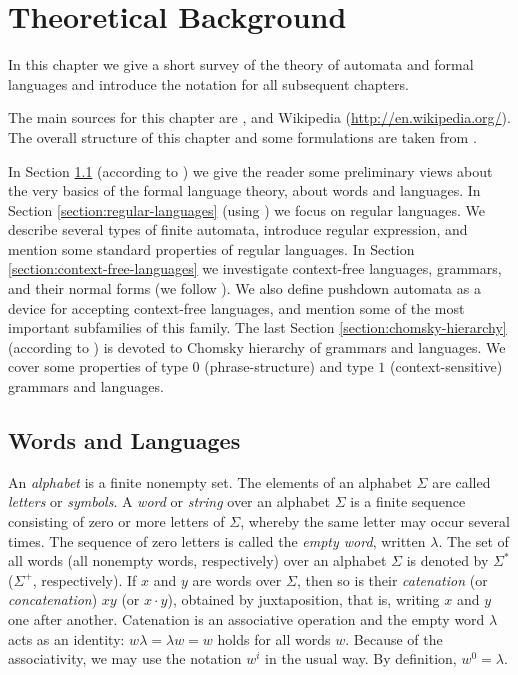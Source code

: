 \chapter{Theoretical Background}
\label{chapter:background}

In this chapter we give a short survey of the theory of automata and formal languages and introduce the notation for all subsequent chapters.

The main sources for this chapter are \citep{RozSal97I, HopcroftMotwaniUllman07}, and Wikipedia (\url{http://en.wikipedia.org/}). The overall structure of this chapter and some formulations are taken from \citep{C10Diploma}.

In Section \ref{section:words-and-languages} (according to \citep{MaSa1997formal}) we give the reader some preliminary views about the very basics of the formal language theory, about words and languages. In Section \ref{section:regular-languages} (using \citep{Sh1997regular}) we focus on regular languages. We describe several types of finite automata, introduce regular expression, and mention some standard properties of regular languages. In Section \ref{section:context-free-languages} we investigate context-free languages, grammars, and their normal forms (we follow \citep{AuBeBo1997context-free}). We also define pushdown automata as a device for accepting context-free languages, and mention some of the most important subfamilies of this family. The last Section \ref{section:chomsky-hierarchy} (according to \citep{MaSa1997aspects}) is devoted to Chomsky hierarchy of grammars and languages. We cover some properties  of type $0$ (phrase-structure) and type $1$ (context-sensitive) grammars and languages.

\section{Words and Languages}
\label{section:words-and-languages}

An \emph{alphabet} is a finite nonempty set. The elements of an alphabet $\Sigma$ are called \emph{letters} or \emph{symbols}. A \emph{word} or \emph{string} over an alphabet $\Sigma$ is a finite sequence consisting of zero or more letters of $\Sigma$, whereby the same letter may occur several times. The sequence of zero letters is called the  \emph{empty word}, written $\lambda$. The set of all words (all nonempty words, respectively) over an alphabet $\Sigma$ is denoted by $\Sigma^*$ ($\Sigma^+$, respectively). If $x$ and $y$ are words over $\Sigma$, then so is their \emph{catenation} (or \emph{concatenation}) $xy$ (or $x \cdot y$), obtained by juxtaposition, that is, writing $x$ and $y$ one after another. Catenation is an associative operation and the empty word $\lambda$ acts as an identity: $w \lambda = \lambda w = w$ holds for all words $w$. Because of the associativity, we may use the notation $w^i$ in the usual way. By definition, $w^0 = \lambda$.

